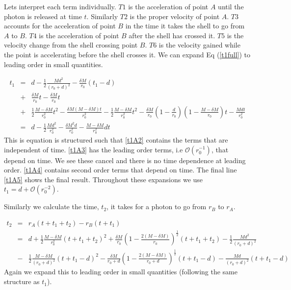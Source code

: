 \documentclass[aps,showpacs,onecolumn,floats,prd,superscriptaddress,nofootinbib]{revtex4-1}
\begin{document}
Lets interpret each term individually. $T1$ is the acceleration of point $A$ until the photon is released at time $t$. Similarly $T2$ is the proper velocity of point $A$. $T3$ accounts for the acceleration of point $B$ in the time it takes the shell to go from $A$ to $B$. $T4$ is the acceleration of point $B$ after the shell has crossed it. $T5$ is the velocity change from the shell crossing point $B$. $T6$ is the velocity gained while the point is accelerating before the shell crosses it. 
We can expand Eq (\ref{t1full}) to leading order in small quantities. 

\begin{eqnarray}
	t_1 & = & d - \frac{1}{2} \frac{Md^2}{(r_0 + d)^2} - \frac{\delta M}{r_0} (t_1 - d) \label{t1A2} \\	
	& + &  \frac{\delta M}{r_0} t - \frac{\delta M}{r_0}t	\label{t1A3}	\\
	& + & \frac{1}{2} \frac{M- \delta M}{r_0^2} t^2 - \frac{\delta M(M- \delta M)t}{r_0^2} - \frac{1}{2} \frac{M- \delta M}{r_0^2} t^2 - \frac{\delta M}{r_0} \left( 1 - \frac{d}{r_0} \right) \left( 1 - \frac{M - \delta M}{r_0} \right) t - \frac{Mdt}{r_0^2}	\label{t1A4}	\\	
	& = & d - \frac{1}{2} \frac{Md^2}{r_0^2} - \frac{\delta M^2d}{r_0^2} - \frac{M- \delta M}{r_0^2} dt	\label{t1A5}
\end{eqnarray}
This is equation is structured such that \ref{t1A2} contains the terms that are independent of time. \ref{t1A3} has the leading order terms, i.e $\mathcal{O}(r_0^{-1})$, that depend on time. We see these cancel and there is no time dependence at leading order. \ref{t1A4} contains second order terms that depend on time. The final line \ref{t1A5} shows the final result. Throughout these expansions we use $t_1 = d + \mathcal{O}(r_0^{-2})$. 

Similarly we calculate the time, $t_2$, it takes for a photon to go from $r_B$ to $r_A$. 

\begin{eqnarray}
	t_2 &  = & r_A(t+t_1 + t_2) - r_B(t+t_1) 	\nonumber	\\
	& = & d + \frac{1}{2} \frac{M- \delta M}{r_0^2} (t + t_1 + t_2)^2 + \frac{\delta M}{r_0} \left( 1 - \frac{2(M- \delta M)}{r_0} \right)^\frac{1}{2} (t + t_1 + t_2) - \frac{1}{2} \frac{Md^2}{(r_0 + d)^2} \nonumber	\\
	& - & \frac{1}{2}\frac{M- \delta M}{(r_0 + d)^2} (t + t_1 - d)^2  - \frac{\delta M}{r_0 + d} \left( 1 - \frac{2(M- \delta M)}{r_0 + d} \right)^\frac{1}{2} (t + t_1 - d) - \frac{Md}{(r_0+d)^2} (t + t_1 -d )
\end{eqnarray}
Again we expand this to leading order in small quantities (following the same structure as $t_1$). 
\end{document}
